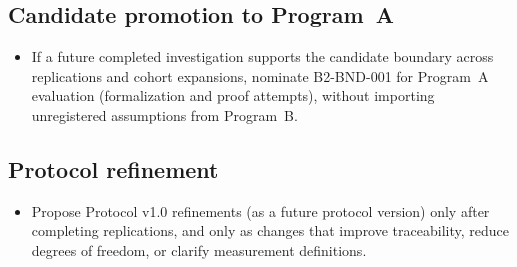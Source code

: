\subsection{Candidate promotion to Program~A}
\begin{itemize}
  \item If a future completed investigation supports the candidate boundary across replications and cohort expansions, nominate B2-BND-001 for Program~A evaluation (formalization and proof attempts), without importing unregistered assumptions from Program~B.
\end{itemize}

\subsection{Protocol refinement}
\begin{itemize}
  \item Propose Protocol v1.0 refinements (as a future protocol version) only after completing replications, and only as changes that improve traceability, reduce degrees of freedom, or clarify measurement definitions.
\end{itemize}
